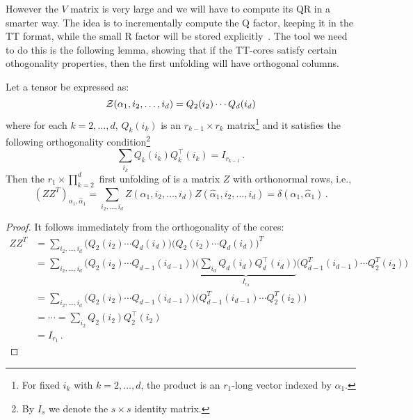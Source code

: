However the $V$ matrix is very large and we will have to compute its QR in a smarter way. The idea is to incrementally compute the Q factor, keeping it in the TT format, while the small R factor will be stored explicitly~\cite{oseledets2011tt}. The tool we need to do this is the following lemma, showing that if the TT-cores satisfy certain othogonality properties, then the first unfolding will have orthogonal columns.
\begin{Lemma}
  Let a tensor \Z be expressed as:
  \begin{equation*}
    \mathcal{Z}(\alpha_1,i_2,\ldots,i_d) = Q_2(i_2) \cdots Q_d(i_d)
  \end{equation*}
  where for each $k = 2,\ldots,d$, $Q_k(i_k)$ is an $r_{k-1} \times r_k$ matrix\footnote{For fixed $i_k$ with $k=2,\ldots,d$, the product is an $r_1$-long vector indexed by $\alpha_1$.} and it satisfies the following orthogonality condition\footnote{By $I_s$ we denote the $s \times s$ identity matrix.}
  \begin{equation} \label{eq:orth_cond}
    \sum_{i_k} Q_k(i_k) Q_k^{\top}(i_k) = I_{r_{k-1}}\, .
  \end{equation}
  Then the $r_1 \times \prod_{k=2}^d$ first unfolding of \Z is a matrix $Z$ with orthonormal rows, i.e.,
  \begin{equation*}
    (Z Z^T)_{\alpha_1,\hat{\alpha}_1} = \sum_{i_2,\ldots,i_d} Z(\alpha_1,i_2,\ldots,i_d) Z(\hat{\alpha}_1,i_2,\ldots,i_d) = \delta(\alpha_1,\hat{\alpha}_1)\, .
  \end{equation*}

  \begin{proof}
    It follows immediately from the orthogonality of the cores:
    \begin{equation*}
      \begin{split}
        ZZ^T &= \sum_{i_2,\ldots,i_d} \Big( Q_2(i_2) \cdots Q_d(i_d) \Big) \Big( Q_2(i_2) \cdots Q_d(i_d) \Big)^T \\
        &= \sum_{i_2,\ldots,i_d} \Big( Q_2(i_2) \cdots Q_{d-1}(i_{d-1}) \Big)
        \underbrace{\Big( \sum_{i_d} Q_d(i_d) Q_d^{\top}(i_d) \Big)}_{I_{r_d}}
        \Big( Q_{d-1}^T(i_{d-1}) \cdots Q_2^T(i_2) \Big) \\
        &= \sum_{i_2,\ldots,i_d} \Big( Q_2(i_2) \cdots Q_{d-1}(i_{d-1}) \Big)
        \Big( Q_{d-1}^T(i_{d-1}) \cdots Q_2^T(i_2) \Big) \\
        &= \cdots = \sum_{i_2} Q_2(i_2) Q_2^{\top}(i_2) \\
        &= I_{r_1} \, .
      \end{split}
    \end{equation*}
  \end{proof}
\end{Lemma}

